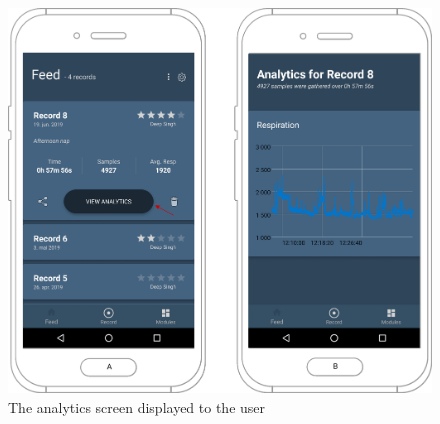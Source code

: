 \begin{figure}
    \centering
    \includegraphics[scale=0.26]{images/Analytics_img.pdf}
    \caption{The analytics screen displayed to the user}
    \label{fig:screen_analytics}
\end{figure}
